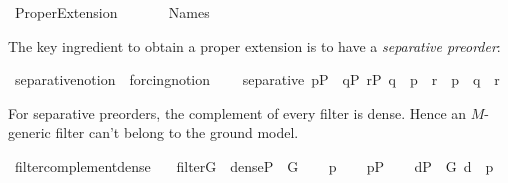 %
\begin{isabellebody}%
%
%
\isadelimdocument
%
\endisadelimdocument
%
\isatagdocument
%
\isamarkuptrue%
%
\endisatagdocument
{\isafolddocument}%
%
\isadelimdocument
%
\endisadelimdocument
%
\isadelimtheory
%
\endisadelimtheory
%
\isatagtheory
{}\isamarkupfalse%
\ Proper{\isacharunderscore}{\kern0pt}Extension\isanewline
\ \ \isanewline
\ \ \ \ Names\isanewline
\isanewline
{}%
\endisatagtheory
{\isafoldtheory}%
%
\isadelimtheory
%
\endisadelimtheory
%
\begin{isamarkuptext}%
The key ingredient to obtain a proper extension is to have
a \emph{separative preorder}:%
\end{isamarkuptext}\isamarkuptrue%
\isamarkupfalse%
\ separative{\isacharunderscore}{\kern0pt}notion\ {\isacharequal}{\kern0pt}\ forcing{\isacharunderscore}{\kern0pt}notion\ {\isacharplus}{\kern0pt}\isanewline
\ \ \ separative{\isacharcolon}{\kern0pt}\ {\isachardoublequoteopen}p{\isasymin}P\ {\isasymLongrightarrow}\ {\isasymexists}q{\isasymin}P{\isachardot}{\kern0pt}\ {\isasymexists}r{\isasymin}P{\isachardot}{\kern0pt}\ q\ {\isasympreceq}\ p\ {\isasymand}\ r\ {\isasympreceq}\ p\ {\isasymand}\ q\ {\isasymbottom}\ r{\isachardoublequoteclose}\isanewline
{}%
\begin{isamarkuptext}%
For separative preorders, the complement of every filter is
dense. Hence an $M$-generic filter can't belong to the ground model.%
\end{isamarkuptext}\isamarkuptrue%
\isamarkupfalse%
\ filter{\isacharunderscore}{\kern0pt}complement{\isacharunderscore}{\kern0pt}dense{\isacharcolon}{\kern0pt}\isanewline
\ \ \ {\isachardoublequoteopen}filter{\isacharparenleft}{\kern0pt}G{\isacharparenright}{\kern0pt}{\isachardoublequoteclose}\ \ {\isachardoublequoteopen}dense{\isacharparenleft}{\kern0pt}P\ {\isacharminus}{\kern0pt}\ G{\isacharparenright}{\kern0pt}{\isachardoublequoteclose}\isanewline
%
\isadelimproof
%
\endisadelimproof
%
\isatagproof
{}\isamarkupfalse%
\isanewline
\ \ \isamarkupfalse%
\ p\isanewline
\ \ \isamarkupfalse%
\ {\isachardoublequoteopen}p{\isasymin}P{\isachardoublequoteclose}\isanewline
\ \ \isamarkupfalse%
\ {\isachardoublequoteopen}{\isasymexists}d{\isasymin}P\ {\isacharminus}{\kern0pt}\ G{\isachardot}{\kern0pt}\ d\ {\isasympreceq}\ p{\isachardoublequoteclose}\isanewline

\end{isabellebody}
